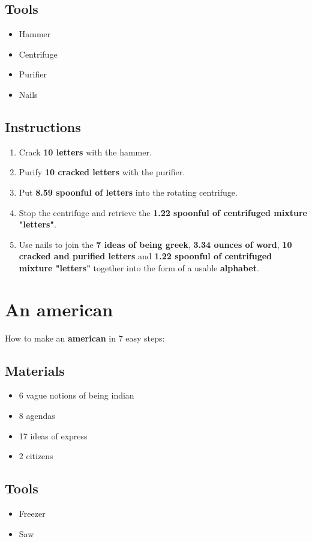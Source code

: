 \documentclass{article}
\begin{document}
\subsection{Tools}\begin{itemize}
\item 
Hammer
\item 
Centrifuge
\item 
Purifier
\item 
Nails
\end{itemize}
\subsection{Instructions}\begin{enumerate}
\item 
Crack \textbf{10 letters} with the hammer.
\item 
Purify \textbf{10 cracked letters} with the purifier.
\item 
Put \textbf{8.59 spoonful of letters} into the rotating centrifuge.
\item 
Stop the centrifuge and retrieve the \textbf{1.22 spoonful of centrifuged mixture "letters"}.
\item 
Use nails to join the \textbf{7 ideas of being greek}, \textbf{3.34 ounces of word}, \textbf{10 cracked and purified letters} and \textbf{1.22 spoonful of centrifuged mixture "letters"} together into the form of a usable \textbf{alphabet}.
\end{enumerate}
\newpage
\section{An american}How to make an \textbf{american} in 7 easy steps:

\subsection{Materials}\begin{itemize}
\item 
6 vague notions of being indian
\item 
8 agendas
\item 
17 ideas of express
\item 
2 citizens
\end{itemize}
\subsection{Tools}\begin{itemize}
\item 
Freezer
\item 
Saw
\end{itemize}
\end{document}
